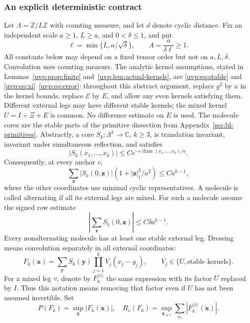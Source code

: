 \documentclass[11pt]{article}
\numberwithin{equation}{section}
\theoremstyle{remark}
\newcommand{\Z}{\mathbb Z}
\newcommand{\C}{\mathbb C}
\newcommand{\diam}{\operatorname{diam}}
\begin{document}
\subsubsection{An explicit deterministic contract}
Let $\Lambda=\Z/L\Z$ with counting measure, and let $d$ denote cyclic
distance. Fix an independent scale $a\ge1$, $L\ge a$, and $0<\delta\le1$, and put
\[
 \ell=\min\{L,a/\sqrt\delta\},\qquad
 A=\frac{a}{\delta\ell}\ge1.
\]
All constants below may depend on a fixed tensor order but not on
$a,L,\delta$. Convolution uses counting measure. The analytic kernel assumptions, stated in
Lemmas~\ref{uvp:prop:finite} and~\ref{uvp:lem:actual-kernels}, are
\eqref{uvp:eq:stable} and \eqref{uvp:eq:xi}--\eqref{uvp:eq:error}:
throughout this abstract argument, replace $g^2$ by $a$ in the kernel
bounds, replace $\mathcal E$ by $E$, and allow any even kernels satisfying them.
Different external legs may have different stable kernels; the mixed
kernel $U=I+\Xi+E$ is common. No difference estimate on $E$ is used.
The molecule cores are the stable parts of the primitive dissection
from Appendix~\ref{sec:bl-primitives}. Abstractly, a core $S_k:\Lambda^k\to\C$, $k\ge3$, is translation
invariant, invariant under simultaneous reflection, and satisfies
\begin{equation}\label{uvp:eq:coreprofile}
 |S_k(x_1,\ldots,x_k)|\le C
          e^{-c\diam(x_1,\ldots,x_k)/a}.
\end{equation}
Consequently, at every anchor $v$,
\begin{equation}\label{uvp:eq:moments}
 \sum_{\boldsymbol z}|S_k(0,\boldsymbol z)|
       (1+|\boldsymbol z|_1^2/a^2)\le C a^{k-1},
\end{equation}
where the other coordinates use minimal cyclic representatives.
A molecule is called alternating if all its external legs are mixed.
For such a molecule assume the signed row estimate
\begin{equation}\label{uvp:eq:mass}
 \left|\sum_{\boldsymbol z}S_k(0,\boldsymbol z)\right|
       \le C\delta a^{k-1}.
\end{equation}
Every nonalternating molecule has at least one stable external leg.
Dressing means convolution separately in all external coordinates:
\[
 F_k(\boldsymbol x)=\sum_{\boldsymbol y}S_k(\boldsymbol y)
                      \prod_{j=1}^k V_j(x_j-y_j),
 \qquad V_j\in\{U,\text{stable kernels}\}.
\]
For a mixed leg $v$, denote by $F_k^{\langle v\rangle}$ the same
expression with its factor $U$ replaced by $I$. Thus this notation
means removing that factor even if $U$ has not been assumed invertible.
Set
\begin{equation}\label{uvp:eq:norms}
 P(F_k)=\sup_{\boldsymbol x}|F_k(\boldsymbol x)|,
 \quad R_v(F_k)=\sup_{\boldsymbol x_{\ne v}}
       \sum_{x_v}|F_k^{\langle v\rangle}(\boldsymbol x)|.
\end{equation}
\end{document}
